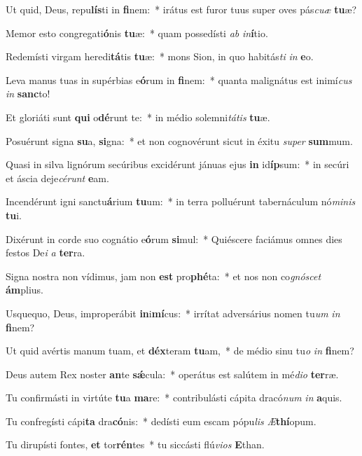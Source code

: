 \item Ut quid, Deus, repu\textbf{lís}ti in \textbf{fi}nem:~* irátus est furor tuus super oves pás\textit{cu}\textit{æ} \textbf{tu}æ?
\item Memor esto congregati\textbf{ó}nis \textbf{tu}æ:~* quam possedísti \textit{ab} \textit{in}\textbf{í}tio.
\item Redemísti virgam heredi\textbf{tá}tis \textbf{tu}æ:~* mons Sion, in quo habitás\textit{ti} \textit{in} \textbf{e}o.
\item Leva manus tuas in supérbias e\textbf{ó}rum in \textbf{fi}nem:~* quanta malignátus est inimí\textit{cus} \textit{in} \textbf{sanc}to!
\item Et gloriáti sunt \textbf{qui} o\textbf{dé}runt te:~* in médio solemni\textit{tá}\textit{tis} \textbf{tu}æ.
\item Posuérunt signa \textbf{su}a, \textbf{si}gna:~* et non cognovérunt sicut in éxitu \textit{su}\textit{per} \textbf{sum}mum.
\item Quasi in silva lignórum secúribus excidérunt jánuas ejus \textbf{in} id\textbf{íp}sum:~* in secúri et áscia deje\textit{cé}\textit{runt} \textbf{e}am.
\item Incendérunt igni sanctu\textbf{á}rium \textbf{tu}um:~* in terra polluérunt tabernáculum nó\textit{mi}\textit{nis} \textbf{tu}i.
\item Dixérunt in corde suo cognátio e\textbf{ó}rum \textbf{si}mul:~* Quiéscere faciámus omnes dies festos De\textit{i} \textit{a} \textbf{ter}ra.
\item Signa nostra non vídimus, jam non \textbf{est} pro\textbf{phé}ta:~* et nos non co\textit{gnó}\textit{scet} \textbf{ám}plius.
\item Usquequo, Deus, improperábit \textbf{in}i\textbf{mí}cus:~* irrítat adversárius nomen tu\textit{um} \textit{in} \textbf{fi}nem?
\item Ut quid avértis manum tuam, et \textbf{déx}teram \textbf{tu}am,~* de médio sinu tu\textit{o} \textit{in} \textbf{fi}nem?
\item Deus autem Rex noster \textbf{an}te \textbf{sǽ}cula:~* operátus est salútem in mé\textit{di}\textit{o} \textbf{ter}ræ.
\item Tu confirmásti in virtúte \textbf{tu}a \textbf{ma}re:~* contribulásti cápita dracó\textit{num} \textit{in} \textbf{a}quis.
\item Tu confregísti cápi\textbf{ta} dra\textbf{có}nis:~* dedísti eum escam pópu\textit{lis} \textit{Æ}\textbf{thí}opum.
\item Tu dirupísti fontes, \textbf{et} tor\textbf{rén}tes~* tu siccásti flú\textit{vi}\textit{os} \textbf{E}than.
